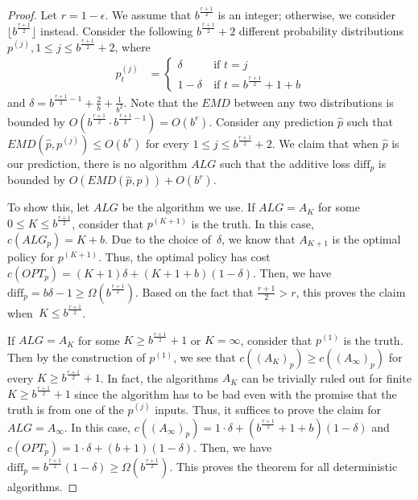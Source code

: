 \begin{proof}
Let $r=1-\epsilon$. We assume that $b^{\frac{r+1}{2}}$ is an integer; otherwise, we consider $\lfloor b^{\frac{r+1}{2}} \rfloor$ instead. Consider the following $b^{\frac{r+1}{2}}+2$ different probability distributions $p^{(j)}, 1 \leq j \leq b^{\frac{r+1}{2}}+2$, where \begin{align*}
    p^{(j)}_t &= 
    \begin{cases} 
      \delta & \ \text{if } t = j \\
      1-\delta & \ \text{if } t = b^{\frac{r+1}{2}} + 1 + b
    \end{cases} 
    \end{align*}
    and $\delta = b^{\frac{r+1}{2}-1}+\frac{2}{b}+\frac{1}{b^2}$. Note that the $EMD$ between any two distributions is bounded by $O(b^{\frac{r+1}{2}} \cdot b^{\frac{r+1}{2}-1}) = O(b^r)$. Consider any prediction $\hat{p}$ such that $EMD(\hat{p},p^{(j)}) \leq O(b^r)$ for every $1 \leq j \leq b^{\frac{r+1}{2}}+2$. We claim that when $\hat{p}$ is our prediction, there is no algorithm $ALG$ such that the additive loss $\text{diff}_p$ is bounded by $O(EMD(\hat{p},p))+O(b^r)$. 

    To show this, let $ALG$ be the algorithm we use. If $ALG=A_K$ for some $0 \leq K \leq b^{\frac{r+1}{2}}$, consider that $p^{(K+1)}$ is the truth. In this case, $c(ALG_p) = K+b$. Due to the choice of~$\delta$, we know that $A_{K+1}$ is the optimal policy for $p^{(K+1)}$. Thus, the optimal policy has cost $c(OPT_p) = (K+1)\delta + (K+1+b)(1-\delta)$. Then, we have $\text{diff}_p = b\delta -1 \geq \Omega(b^{\frac{r+1}{2}})$. Based on the fact that $\frac{r+1}{2}>r$, this proves the claim when~$K \leq b^{\frac{r+1}{2}}$. 

    If $ALG=A_K$ for some $K \geq b^{\frac{r+1}{2}}+1$ or $K=\infty$, consider that $p^{(1)}$ is the truth. Then by the construction of $p^{(1)}$, we see that $c((A_K)_p) \geq c((A_\infty)_p)$ for every $K \geq b^{\frac{r+1}{2}}+1$. In fact, the algorithms $A_K$ can be trivially ruled out for finite $K \geq b^{\frac{r+1}{2}}+1$ since the algorithm has to be bad even with the promise that the truth is from one of the $p^{(j)}$ inputs. Thus, it suffices to prove the claim for $ALG=A_\infty$. In this case, $c((A_\infty)_p)=1\cdot \delta + (b^{\frac{r+1}{2}} + 1 + b)(1-\delta)$ and $c(OPT_p)=1\cdot \delta+(b+1)(1-\delta)$. Then, we have $\text{diff}_p = b^{\frac{r+1}{2}}(1-\delta) \geq \Omega(b^{\frac{r+1}{2}})$. This proves the theorem for all deterministic algorithms.


\end{proof}
